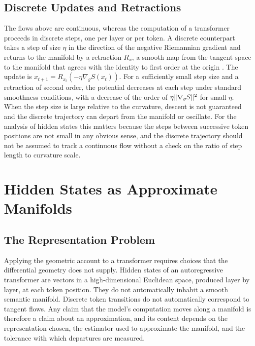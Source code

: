 \section{Discrete Updates and Retractions}

The flows above are continuous, whereas the computation of a transformer proceeds in discrete steps, one per layer or per token. A discrete counterpart takes a step of size $\eta$ in the direction of the negative Riemannian gradient and returns to the manifold by a retraction $R_x$, a smooth map from the tangent space to the manifold that agrees with the identity to first order at the origin \cite{absil2008}. The update is $x_{t+1}=R_{x_t}(-\eta\nabla_gS(x_t))$. For a sufficiently small step size and a retraction of second order, the potential decreases at each step under standard smoothness conditions, with a decrease of the order of $\eta\lVert \nabla_gS\rVert^2$ for small $\eta$. When the step size is large relative to the curvature, descent is not guaranteed and the discrete trajectory can depart from the manifold or oscillate. For the analysis of hidden states this matters because the steps between successive token positions are not small in any obvious sense, and the discrete trajectory should not be assumed to track a continuous flow without a check on the ratio of step length to curvature scale.

\chapter{Hidden States as Approximate Manifolds}
\label{ch:hidden-states}

\section{The Representation Problem}

Applying the geometric account to a transformer requires choices that the differential geometry does not supply. Hidden states of an autoregressive transformer are vectors in a high-dimensional Euclidean space, produced layer by layer, at each token position. They do not automatically inhabit a smooth semantic manifold. Discrete token transitions do not automatically correspond to tangent flows. Any claim that the model's computation moves along a manifold is therefore a claim about an approximation, and its content depends on the representation chosen, the estimator used to approximate the manifold, and the tolerance with which departures are measured.

